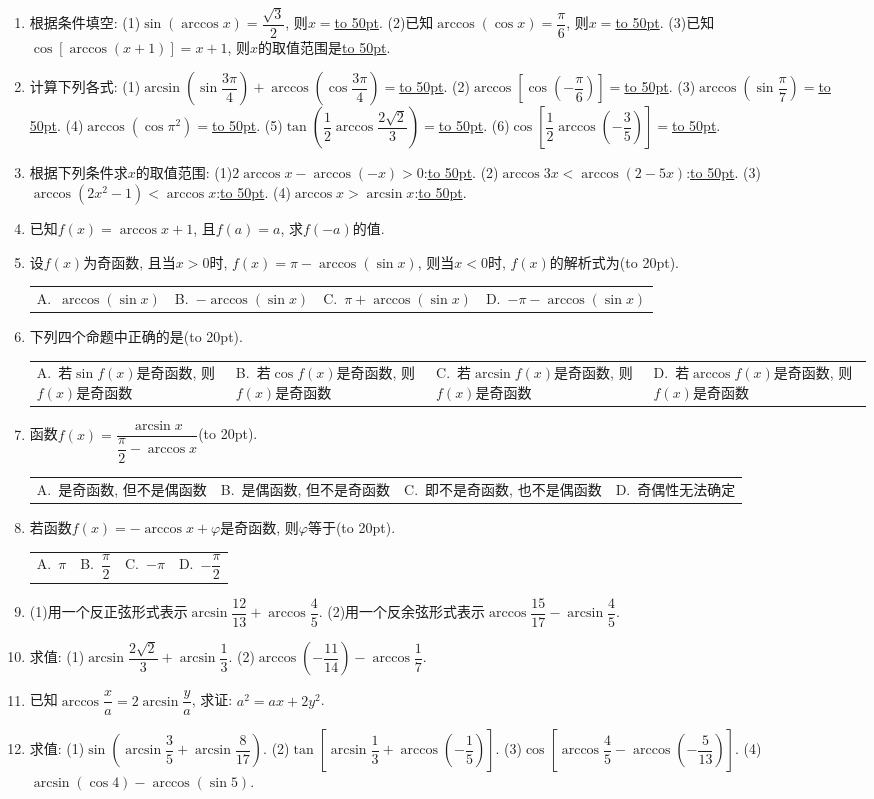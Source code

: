 \documentclass[10pt,a4paper]{article}
\newcommand{\blank}[1]{\underline{\hbox to #1pt{}}}
\newcommand{\bracket}[1]{(\hbox to #1pt{})}
\newcommand{\fourch}[4]{\par\begin{tabular}{p{.23\textwidth}p{.23\textwidth}p{.23\textwidth}p{.23\textwidth}}
A.~#1 &B.~#2& C.~#3& D.~#4
\end{tabular}}
\begin{document}
\begin{enumerate}[1.]
(2)函数$f(x)=\dfrac 12\arccos (x+2)$的反函数是\blank{50}.
\item 根据条件填空:
(1)$\sin (\arccos x)=\dfrac{\sqrt 3}2$, 则$x=$\blank{50}.
(2)已知$\arccos (\cos x)=\dfrac{\pi }6$, 则$x=$\blank{50}.
(3)已知$\cos [\arccos (x+1)]=x+1$, 则$x$的取值范围是\blank{50}.
\item 计算下列各式:
(1)$\arcsin (\sin \dfrac{3\pi }4)+\arccos (\cos \dfrac{3\pi }4)=$\blank{50}.
(2)$\arccos [\cos (-\dfrac{\pi }6)]=$\blank{50}.
(3)$\arccos (\sin \dfrac{\pi }7)=$\blank{50}.
(4)$\arccos (\cos \pi ^2)=$\blank{50}.
(5)$\tan (\dfrac 12\arccos \dfrac{2\sqrt 2}3)=$\blank{50}.
(6)$\cos [\dfrac 12\arccos (-\dfrac 35)]=$\blank{50}.
\item 根据下列条件求$x$的取值范围:
(1)$2\arccos x-\arccos (-x)>0$:\blank{50}.
(2)$\arccos 3x<\arccos (2-5x)$:\blank{50}.
(3)$\arccos (2x^2-1)<\arccos x$:\blank{50}.
(4)$\arccos x>\arcsin x$:\blank{50}.
\item 已知$f(x)=\arccos x+1$, 且$f(a)=a$, 求$f(-a)$的值.
\item 设$f(x)$为奇函数, 且当$x>0$时, $f(x)=\pi -\arccos (\sin x)$, 则当$x<0$时, $f(x)$的解析式为\bracket{20}.
\fourch{$\arccos (\sin x)$}{$-\arccos (\sin x)$}{$\pi +\arccos (\sin x)$}{$-\pi -\arccos (\sin x)$}
\item 下列四个命题中正确的是\bracket{20}.
\fourch{若$\sin f(x)$是奇函数, 则$f(x)$是奇函数}{若$\cos f(x)$是奇函数, 则$f(x)$是奇函数}{若$\arcsin f(x)$是奇函数, 则$f(x)$是奇函数}{若$\arccos f(x)$是奇函数, 则$f(x)$是奇函数}
\item 函数$f(x)=\dfrac{\arcsin x}{\dfrac{\pi }2-\arccos x}$\bracket{20}.
\fourch{是奇函数, 但不是偶函数}{是偶函数, 但不是奇函数}{即不是奇函数, 也不是偶函数}{奇偶性无法确定}
\item 若函数$f(x)=-\arccos x+\varphi$是奇函数, 则$\varphi$等于\bracket{20}.
\fourch{$\pi$}{$\dfrac{\pi }2$}{$-\pi$}{$-\dfrac{\pi }2$}
\item (1)用一个反正弦形式表示$\arcsin \dfrac{12}{13}+\arccos \dfrac 45$.
(2)用一个反余弦形式表示$\arccos \dfrac{15}{17}-\arcsin \dfrac 45$.
\item 求值:
(1)$\arcsin \dfrac{2\sqrt 2}3+\arcsin \dfrac 13$.				(2)$\arccos (-\dfrac{11}{14})-\arccos \dfrac 17$.
\item 已知$\arccos \dfrac xa=2\arcsin \dfrac ya$, 求证: $a^2=ax+2y^2$.
\item 求值:
(1)$\sin (\arcsin \dfrac 35+\arcsin \dfrac 8{17})$.			(2)$\tan [\arcsin \dfrac 13+\arccos (-\dfrac 15)]$.
(3)$\cos [\arccos \dfrac 45-\arccos (-\dfrac 5{13})]$.		(4)$\arcsin (\cos 4)-\arccos (\sin 5)$.

\end{enumerate}
\end{document}
